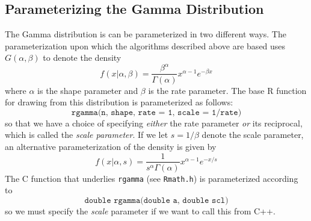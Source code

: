\documentclass[12pt]{article}
\begin{document}
\subsection{Parameterizing the Gamma Distribution}
The Gamma distribution is can be parameterized in two different ways. 
The parameterization upon which the algorithms described above are based uses $G(\alpha,\beta)$ to denote the density 
\begin{equation*}
  f(x|\alpha,\beta) = \frac{\beta^\alpha}{\Gamma(\alpha)}x^{\alpha-1}e^{-\beta x}
\end{equation*}
where $\alpha$ is the shape parameter and $\beta$ is the rate parameter.
The base R function for drawing from this distribution is parameterized as follows:
\begin{equation*}
  \texttt{rgamma(n, shape, rate = 1, scale = 1/rate)}
\end{equation*}
so that we have a choice of specifying \emph{either} the rate parameter \emph{or} its reciprocal, which is called the \emph{scale parameter}.
If we let $s = 1/\beta$ denote the scale parameter, an alternative parameterization of the density is given by
\begin{equation*}
  f(x|\alpha,s)= \frac{1}{s^{\alpha} \Gamma(\alpha)} x^{\alpha-1} e^{-x/s}
\end{equation*}
The C function that underlies \texttt{rgamma} (see \texttt{Rmath.h}) is parameterized according to
\begin{equation*}
  \texttt{double rgamma(double a, double scl)}
\end{equation*}
so we must specify the \emph{scale} parameter if we want to call this from C++.
\end{document}
